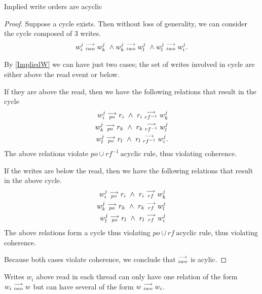     \begin{property}
        \label{prop6}
        Implied write orders are acyclic
    \end{property}

    \begin{proof}
        Suppose a cycle exists. Then without loss of generality, we can consider the cycle composed of 3 writes.
        \begin{align}
            \reln{w_i^j}{iwo}{w_k^j} \ \wedge \reln{w_k^j}{iwo}{w_l^j} \ \wedge \reln{w_l^j}{iwo}{w_i^j}.  
        \end{align}
        
        By \ref{ImpliedW} we can have just two cases; the set of writes involved in cycle are either above the read event or below.

        If they are above the read, then we have the following relations that result in the cycle
        \begin{align}
            w_i^j\stackrel{\longrightarrow}{_{po}}r_i \ \wedge \ r_i\stackrel{\longrightarrow}{_{rf^{-1}}}w_k^j \\
            w_k^j\stackrel{\longrightarrow}{_{po}}r_k \ \wedge \ r_k\stackrel{\longrightarrow}{_{rf^{-1}}}w_l^j \\
            w_l^j\stackrel{\longrightarrow}{_{po}}r_l \ \wedge \ r_l\stackrel{\longrightarrow}{_{rf^{-1}}}w_i^j. 
        \end{align}
        The above relations violate $po \cup rf^{-1} \ \text{acyclic}$ rule, thus violating coherence.
        
        If the writes are below the read, then we have the following relations that result in the above cycle.
        \begin{align}
            w_i^j\stackrel{\longrightarrow}{_{po}}r_i \ \wedge \ r_i\stackrel{\longrightarrow}{_{rf}}w_k^j \\
            w_k^j\stackrel{\longrightarrow}{_{po}}r_k \ \wedge \ r_k\stackrel{\longrightarrow}{_{rf}}w_l^j \\
            w_l^j\stackrel{\longrightarrow}{_{po}}r_l \ \wedge \ r_l\stackrel{\longrightarrow}{_{rf}}w_i^j 
        \end{align}
        The above relations form a cycle thus violating $po \cup rf \ \text{acyclic}$ rule, thus violating coherence.

        Because both cases violate coherence, we conclude that $\stackrel{\longrightarrow}{_{iwo}}$ is acylic. 
    \end{proof}


    \begin{property}
        \label{prop7}
        Writes $w_i$ above read in each thread can only have one relation of the form $w_i\stackrel{\longrightarrow}{_{iwo}}w$ but can have several of the form $w\stackrel{\longrightarrow}{_{iwo}}w_i$. 
    \end{property}

